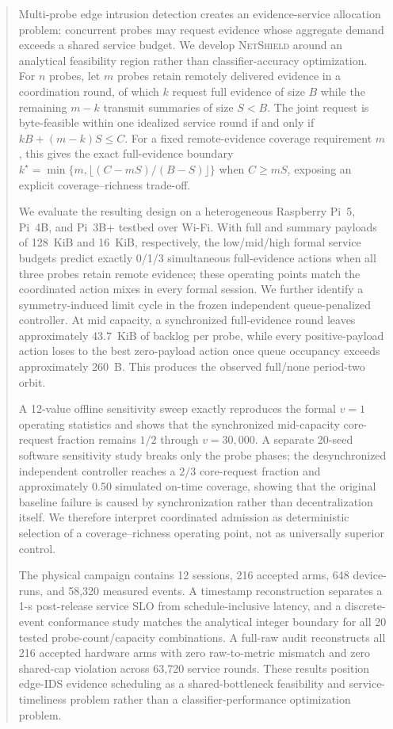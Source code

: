 \documentclass[10pt,journal]{IEEEtran}
\newcommand{\NetShield}{\textsc{NetShield}}
\begin{document}
\begin{abstract}
Multi-probe edge intrusion detection creates an evidence-service allocation
problem: concurrent probes may request evidence whose aggregate demand
exceeds a shared service budget. We develop \NetShield{} around an
analytical feasibility region rather than classifier-accuracy optimization.
For $n$ probes, let $m$ probes retain remotely delivered evidence in a
coordination round, of which $k$ request full evidence of size $B$ while
the remaining $m-k$ transmit summaries of size $S<B$. The joint request
is byte-feasible within one idealized service round if and only if
$kB+(m-k)S\leq C$. For a fixed remote-evidence coverage requirement $m$,
this gives the exact full-evidence boundary
$k^\star=\min\{m,\lfloor(C-mS)/(B-S)\rfloor\}$ when $C\geq mS$,
exposing an explicit coverage--richness trade-off.

We evaluate the resulting design on a heterogeneous Raspberry Pi~5,
Pi~4B, and Pi~3B+ testbed over Wi-Fi. With full and summary payloads of
128~KiB and 16~KiB, respectively, the low/mid/high formal service
budgets predict exactly 0/1/3 simultaneous full-evidence actions when
all three probes retain remote evidence; these operating points match
the coordinated action mixes in every formal session. We further identify
a symmetry-induced limit cycle in the frozen independent queue-penalized
controller. At mid capacity, a synchronized full-evidence round leaves
approximately 43.7~KiB of backlog per probe, while every positive-payload
action loses to the best zero-payload action once queue occupancy exceeds
approximately 260~B. This produces the observed
full/none period-two orbit.

A 12-value offline sensitivity sweep exactly reproduces the formal
$v=1$ operating statistics and shows that the synchronized mid-capacity
core-request fraction remains $1/2$ through $v=30{,}000$.
A separate 20-seed software sensitivity study breaks only the probe
phases; the desynchronized independent controller reaches a $2/3$
core-request fraction and approximately 0.50 simulated on-time coverage,
showing that the original baseline failure is caused by synchronization
rather than decentralization itself. We therefore interpret coordinated
admission as deterministic selection of a coverage--richness operating
point, not as universally superior control.

The physical campaign contains 12 sessions, 216 accepted arms, 648
device-runs, and 58,320 measured events. A timestamp reconstruction
separates a 1-s post-release service SLO from schedule-inclusive latency,
and a discrete-event conformance study matches the analytical integer
boundary for all 20 tested probe-count/capacity combinations. A full-raw
audit reconstructs all 216 accepted hardware arms with zero
raw-to-metric mismatch and zero shared-cap violation across 63,720
service rounds. These results position edge-IDS evidence scheduling as a
shared-bottleneck feasibility and service-timeliness problem rather than
a classifier-performance optimization problem.
\end{abstract}
\end{document}
